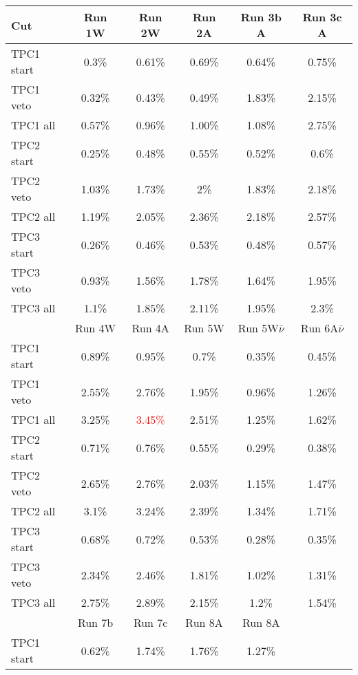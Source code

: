 \documentclass[../main.tex]{subfiles}
\begin{document}
\begin{table}
\begin{center}
\begin{tabular}{|l|c|c|c|c|c|}
  \hline
  Cut         &Run 1W   &Run 2W   & Run 2A  & Run 3b A&Run 3c A\\
  \hline
  TPC1 start  & 0.3\%   & 0.61\%  & 0.69\%  & 0.64\%  & 0.75\%  \\
  TPC1 veto   & 0.32\%  & 0.43\%  & 0.49\%  & 1.83\%  & 2.15\%  \\
  TPC1 all    & 0.57\%  & 0.96\%  & 1.00\%  & 1.08\%  & 2.75\%   \\
  \hline
  TPC2 start  & 0.25\%  & 0.48\%  & 0.55\%  & 0.52\%  & 0.6\%  \\
  TPC2 veto   & 1.03\%  & 1.73\%  & 2\%     & 1.83\%  & 2.18\% \\
  TPC2 all    & 1.19\%  & 2.05\%  & 2.36\%  & 2.18\%  & 2.57\%  \\
  \hline
  TPC3 start  & 0.26\%  & 0.46\%  & 0.53\%  & 0.48\%  & 0.57\%  \\
  TPC3 veto   & 0.93\%  & 1.56\%  & 1.78\%  & 1.64\%  & 1.95\%  \\
  TPC3 all    & 1.1\%   & 1.85\%  & 2.11\%  & 1.95\%  & 2.3\%  \\
  \hline
  \hline
              &Run 4W   &Run 4A   &Run 5W   &Run 5W$\bar{\nu}$  &Run 6A$\bar{\nu}$\\
  \hline
  TPC1 start  & 0.89\%  & 0.95\% & 0.7\% & 0.35\% & 0.45\% \\
  TPC1 veto   & 2.55\%  & 2.76\% & 1.95\% & 0.96\% & 1.26\% \\
  TPC1 all    & 3.25\%  &\textcolor{red}{3.45\%} & 2.51\% & 1.25\% & 1.62\% \\
  \hline
  TPC2 start  & 0.71\%  & 0.76\% & 0.55\% & 0.29\% & 0.38\% \\
  TPC2 veto   & 2.65\%  & 2.76\% & 2.03\% & 1.15\% & 1.47\% \\
  TPC2 all    & 3.1\%   & 3.24\% & 2.39\% & 1.34\% & 1.71\% \\
  \hline
  TPC3 start  & 0.68\%  & 0.72\% & 0.53\% & 0.28\% & 0.35\% \\
  TPC3 veto   & 2.34\%  & 2.46\% & 1.81\% & 1.02\% & 1.31\% \\
  TPC3 all    & 2.75\%  & 2.89\% & 2.15\% & 1.2\% & 1.54\% \\
  \hline
  \hline
              &Run 7b   &Run 7c   &Run 8A   &Run 8A  & \\
  \hline
  TPC1 start  & 0.62\%  & 1.74\% & 1.76\% & 1.27\% & \\

\end{tabular}
\end{center}
\end{table}
\end{document}
